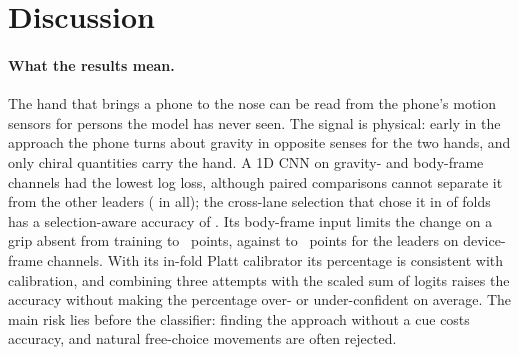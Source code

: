 \section{Discussion}\label{sec:discussion}

\paragraph{What the results mean.} The hand that brings a phone to the nose can be read from the phone's motion
sensors for persons the model has never seen. The signal is physical: early in the approach the phone turns about
gravity in opposite senses for the two hands, and only chiral quantities carry the hand. A 1D CNN on gravity- and
body-frame channels had the lowest log loss, although paired comparisons cannot separate it from the other leaders
( in all); the cross-lane selection that chose it in  of
 folds has a selection-aware accuracy of . Its body-frame input limits
the change on a grip absent from training to ~points, against 
to ~points for the leaders on device-frame channels. With its in-fold Platt calibrator its percentage is
consistent with calibration, and combining three attempts with the scaled sum of logits raises the accuracy without
making the percentage over- or under-confident on average. The main risk lies before the
classifier: finding the approach without a cue costs accuracy, and natural free-choice movements are often
rejected.

